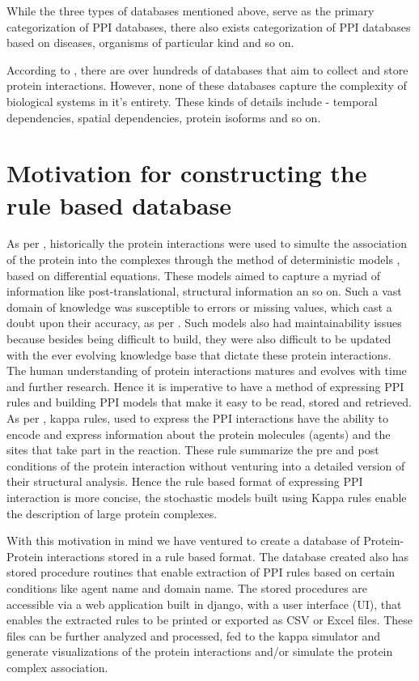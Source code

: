 \documentclass[msc,deptreport,ai]{infthesis}      %
\begin{document}
While the three types of databases mentioned above, serve as the primary categorization of PPI databases, there also exists categorization of PPI databases based on diseases, organisms of particular kind and so on.

According to \cite{typesOfPPIdb}, there are over hundreds of databases that aim to collect and store protein interactions. However, none of these databases capture the complexity of biological systems in it's entirety. These kinds of details include - temporal dependencies, spatial dependencies, protein isoforms and so on.

\section{Motivation for constructing the rule based database}
As per \cite{kappaPlatform}, historically the protein interactions were used to simulte the association of the protein into the complexes through the method of deterministic models , based on differential equations. These models aimed to capture a myriad of information like post-translational, structural information an so on. Such a vast domain of knowledge was susceptible to errors or missing values, which cast a doubt upon their accuracy, as per \cite{kappaPlatform}. Such models also had maintainability issues because besides being difficult to build, they were also difficult to be updated with the ever evolving knowledge base that dictate these protein interactions. The human understanding of protein interactions matures and evolves with time and further research. Hence it is imperative to have a method of expressing PPI rules and building PPI models that make it easy to be read, stored and retrieved. As per \cite{kappaPlatform}, kappa rules, used to express the PPI interactions have the ability to encode and express information about the protein molecules (agents) and the sites that take part in the reaction. These rule summarize the pre and post conditions of the protein interaction without venturing into a detailed version of their structural analysis. Hence the rule based format of expressing PPI interaction is more concise, the stochastic models built using Kappa rules enable the description of large protein complexes.

With this motivation in mind we have ventured to create a database of Protein-Protein interactions stored in a rule based format. The database created also has stored procedure routines that enable extraction of PPI rules based on certain conditions like agent name and domain name. The stored procedures are accessible via a web application built in django, with a user interface (UI), that enables the extracted rules to be printed or exported as CSV or Excel files. These files can be further analyzed and processed, fed to the kappa simulator \cite{kasim} and generate visualizations of the protein interactions and/or simulate the protein complex association.
\end{document}
